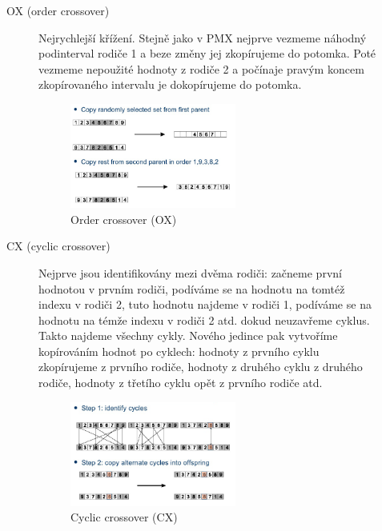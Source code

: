 \begin{description}
\begin{description}
\begin{figure}[H]
		\end{figure}
		\item[OX (order crossover)] Nejrychlejší křížení. Stejně jako v PMX nejprve vezmeme náhodný podinterval rodiče 1 a beze změny jej zkopírujeme do potomka. Poté vezmeme nepoužité hodnoty z rodiče 2 a počínaje pravým koncem zkopírovaného intervalu je dokopírujeme do potomka.
		
		\begin{figure}[H]
			\centering			
			\includegraphics[width=0.6\textwidth]{img/ox.png}
			\caption{Order crossover (OX)}
			\label{pmx}
			
		\end{figure}
		\item[CX (cyclic crossover)] Nejprve jsou identifikovány  mezi dvěma rodiči: začneme první hodnotou v prvním rodiči, podíváme se na hodnotu na tomtéž indexu v rodiči 2, tuto hodnotu najdeme v rodiči 1, podíváme se na hodnotu na témže indexu v rodiči 2 atd. dokud neuzavřeme cyklus. Takto najdeme všechny cykly. Nového jedince pak vytvoříme kopírováním hodnot po cyklech: hodnoty z prvního cyklu zkopírujeme z prvního rodiče, hodnoty z druhého cyklu z druhého rodiče, hodnoty z třetího cyklu opět z prvního rodiče atd.
		
		\begin{figure}[H]
			\centering			
			\includegraphics[width=0.6\textwidth]{img/cx.png}
			\caption{Cyclic crossover (CX)}
			\label{cx}
			
		\end{figure}
		

\end{description}
\end{description}
